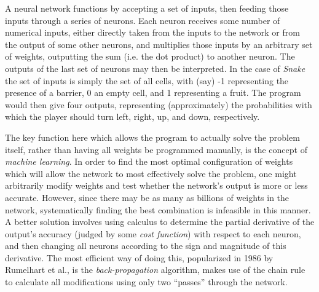 \documentclass{sigplanconf}
\begin{document}
A neural network functions by accepting a set of inputs, then feeding those inputs through a series of neurons. Each neuron receives some number of numerical inputs, either directly taken from the inputs to the network or from the output of some other neurons, and multiplies those inputs by an arbitrary set of weights, outputting the sum (i.e. the dot product) to another neuron. The outputs of the last set of neurons may then be interpreted. In the case of \textit{Snake} the set of inputs is simply the set of all cells, with (say) -1 representing the presence of a barrier, 0 an empty cell, and 1 representing a fruit. The program would then give four outputs, representing (approximately) the probabilities with which the player should turn left, right, up, and down, respectively.

The key function here which allows the program to actually solve the problem itself, rather than having all weights be programmed manually, is the concept of \textit{machine learning}. In order to find the most optimal configuration of weights which will allow the network to most effectively solve the problem, one might arbitrarily modify weights and test whether the network's output is more or less accurate. However, since there may be as many as billions of weights in the network, systematically finding the best combination is infeasible in this manner. A better solution involves using calculus to determine the partial derivative of the output's accuracy (judged by some \textit{cost function}) with respect to each neuron, and then changing all neurons according to the sign and magnitude of this derivative. The most efficient way of doing this, popularized in 1986 by Rumelhart et al., is the \textit{back-propagation} algorithm, makes use of the chain rule to calculate all modifications using only two ``passes'' through the network.
\end{document}
